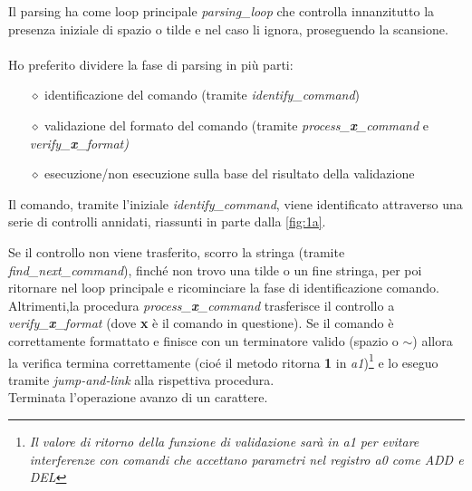 \documentclass[11pt]{report}
\begin{document}
        Il parsing ha come loop principale \textit{parsing\_loop} che controlla innanzitutto la presenza iniziale di spazio o tilde e nel caso li ignora, proseguendo la scansione.
        \\\\Ho preferito dividere la fase di parsing in più parti:
        \begin{itemize}
            \item[$\diamond$] identificazione del comando (tramite \textit{identify\_command})
            \item[$\diamond$] validazione del formato del comando (tramite \textit{process\_\textbf{x}\_command} e \textit{verify\_\textbf{x}\_format)}
            \item[$\diamond$] esecuzione/non esecuzione sulla base del risultato della validazione
        \end{itemize}

        Il comando, tramite l'iniziale \textit{identify\_command}, viene identificato attraverso una serie di controlli annidati, riassunti in parte dalla \ref{fig:1a}.
        \begin{figure}[H]
            \centering

            \hfill
            \label{fig1}
            \caption[]{}
        \end{figure}
        
       Se il controllo non viene trasferito, scorro la stringa (tramite \textit{find\_next\_command}), finché non trovo una tilde o un fine stringa, per poi ritornare nel loop principale e ricominciare la fase di identificazione comando. \\
       Altrimenti,la procedura \textit{process\_\textbf{x}\_command} trasferisce il controllo a \textit{verify\_\textbf{x}\_format} (dove \textbf{x} è il comando in questione).
       Se il comando è correttamente formattato e finisce con un terminatore valido (spazio o $\sim$) allora la verifica termina correttamente (cioé il metodo ritorna \textbf{1} in  \textit{a1})\footnote[1]{\textit{Il valore di ritorno della funzione di validazione sarà in a1 per evitare interferenze con comandi che accettano parametri nel registro \textit{a0} come ADD e DEL}} e lo eseguo tramite \textit{jump-and-link} alla rispettiva procedura.\\ Terminata l'operazione avanzo di un carattere.
\end{document}
